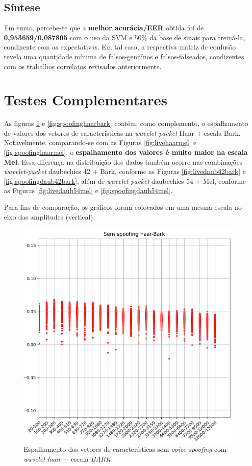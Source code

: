 			\FloatBarrier
		\subsection{Síntese}
   			\par Em suma, percebe-se que a \textbf{melhor acurácia/EER} obtida foi de \textbf{0,953659/0,087805} com o uso da SVM e 50\% da base de sinais para treiná-la, condizente com as expectativas. Em tal caso, a respectiva matriz de confusão revela uma quantidade mínima de falsos-genuínos e falsos-falseados, condizentes com os trabalhos correlatos revisados anteriormente.

	\section{Testes Complementares}
	\label{chap:testsResults:sec:Experimento05}
		As figuras \ref{fig:livehaarbark} e \ref{fig:spoofinghaarbark} contém, como complemento, o espalhamento de valores dos vetores de características na \textit{wavelet-packet} Haar + escala Bark. Notavelmente, comparando-se com as Figuras \ref{fig:livehaarmel} e \ref{fig:spoofinghaarmel}, o \textbf{espalhamento dos valores é muito maior na escala \textbf{Mel}}. Essa diferença na distribuição dos dados também ocorre nas combinações \textit{wavelet-packet} daubechies 42 + Bark, conforme as Figuras \ref{fig:livedaub42bark} e \ref{fig:spoofingdaub42bark}, além de \textit{wavelet-packet} daubechies 54 + Mel, conforme as Figuras \ref{fig:livedaub54mel} e \ref{fig:spoofingdaub54mel}.
		
		\par Para fins de comparação, os gráficos foram colocados em uma mesma escala no eixo das amplitudes (vertical).
		\begin{figure}[!h]
			\centering
			\includegraphics[width=.70\linewidth, height=.68\linewidth]{images/results/barkVersusMel/liveHaarBark}
			\caption{Espalhamento dos vetores de características sem \textit{voice spoofing} com \textit{wavelet haar} + escala \textit{BARK} }
			\label{fig:livehaarbark}
		\end{figure}
	
